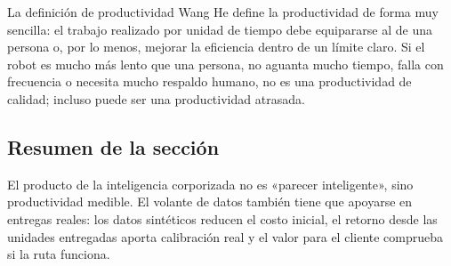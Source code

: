 \begin{importantbox}{La definición de productividad}
Wang He define la productividad de forma muy sencilla: el trabajo realizado por unidad de tiempo debe equipararse al de una persona o, por lo menos, mejorar la eficiencia dentro de un límite claro. Si el robot es mucho más lento que una persona, no aguanta mucho tiempo, falla con frecuencia o necesita mucho respaldo humano, no es una productividad de calidad; incluso puede ser una productividad atrasada.
\end{importantbox}

\subsection{Resumen de la sección}

El producto de la inteligencia corporizada no es «parecer inteligente», sino productividad medible. El volante de datos también tiene que apoyarse en entregas reales: los datos sintéticos reducen el costo inicial, el retorno desde las unidades entregadas aporta calibración real y el valor para el cliente comprueba si la ruta funciona.
